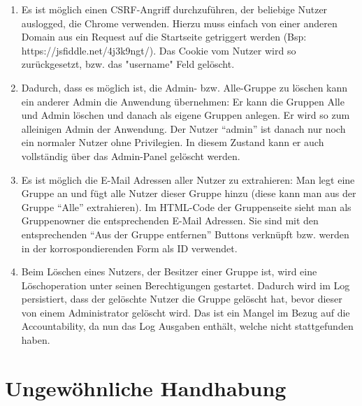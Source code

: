 \documentclass[12pt,DIV14,BCOR10mm,a4paper,parskip=half-,headsepline,headinclude,english,ngerman,bibliography=totocnumbered]{scrreprt}
\begin{document}
\begin{enumerate}
\begin{enumerate}
\item Es ist möglich einen CSRF-Angriff durchzuführen, der beliebige Nutzer auslogged, die Chrome verwenden. Hierzu muss einfach von einer anderen Domain aus ein Request auf die Startseite getriggert werden (Bsp: https://jsfiddle.net/4j3k9ngt/). Das Cookie vom Nutzer wird so zurückgesetzt, bzw. das "username" Feld gelöscht.
\item Dadurch, dass es möglich ist, die Admin- bzw. Alle-Gruppe zu löschen kann ein anderer Admin die Anwendung übernehmen: Er kann die Gruppen Alle und Admin löschen und danach als eigene Gruppen anlegen. Er wird so zum alleinigen Admin der Anwendung. Der Nutzer \enquote{admin} ist danach nur noch ein normaler Nutzer ohne Privilegien. In diesem Zustand kann er auch vollständig über das Admin-Panel gelöscht werden.
\item Es ist möglich die E-Mail Adressen aller Nutzer zu extrahieren: Man legt eine Gruppe an und fügt alle Nutzer dieser Gruppe hinzu (diese kann man aus der Gruppe \enquote{Alle} extrahieren). Im HTML-Code der Gruppenseite sieht man als Gruppenowner die entsprechenden E-Mail Adressen. Sie sind mit den entsprechenden \enquote{Aus der Gruppe entfernen} Buttons verknüpft bzw. werden in der korrospondierenden Form als ID verwendet.
\item Beim Löschen eines Nutzers, der Besitzer einer Gruppe ist, wird eine Löschoperation unter seinen Berechtigungen gestartet. Dadurch wird im Log persistiert, dass der gelöschte Nutzer die Gruppe gelöscht hat, bevor dieser von einem Administrator gelöscht wird. Das ist ein Mangel im Bezug auf die Accountability, da nun das Log Ausgaben enthält, welche nicht stattgefunden haben.
\end{enumerate}

\chapter{Ungewöhnliche Handhabung}


\end{enumerate}
\end{document}

